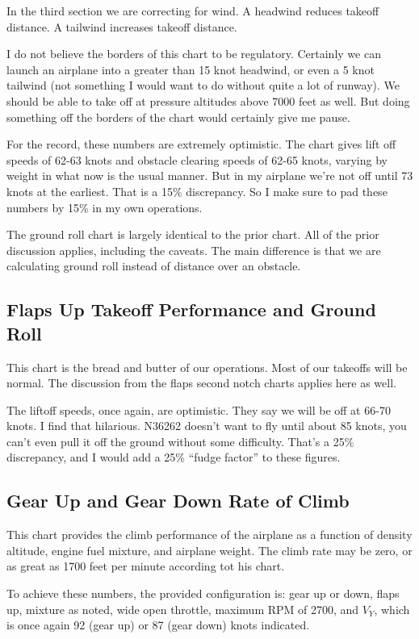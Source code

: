 In the third section we are correcting for wind. A headwind reduces takeoff distance. A tailwind increases takeoff distance.

I do not believe the borders of this chart to be regulatory. Certainly we can launch an airplane into a greater than 15 knot headwind, or even a 5 knot tailwind (not something I would want to do without quite a lot of runway). We should be able to take off at pressure altitudes above 7000 feet as well. But doing something off the borders of the chart would certainly give me pause.

For the record, these numbers are extremely optimistic. The chart gives lift off speeds of 62-63 knots and obstacle clearing speeds of 62-65 knots, varying by weight in what now is the usual manner. But in my airplane we're not off until 73 knots at the earliest. That is a 15\% discrepancy. So I make sure to pad these numbers by 15\% in my own operations.

The ground roll chart is largely identical to the prior chart. All of the prior discussion applies, including the caveats. The main difference is that we are calculating ground roll instead of distance over an obstacle.

\subsection{Flaps Up Takeoff Performance and Ground Roll}

This chart is the bread and butter of our operations. Most of our takeoffs will be normal. The discussion from the flaps second notch charts applies here as well.

The liftoff speeds, once again, are optimistic. They say we will be off at 66-70 knots. I find that hilarious. N36262 doesn't want to fly until about 85 knots, you can't even pull it off the ground without some difficulty. That's a 25\% discrepancy, and I would add a 25\% ``fudge factor'' to these figures.

\subsection{Gear Up and Gear Down Rate of Climb}

This chart provides the climb performance of the airplane as a function of density altitude, engine fuel mixture, and airplane weight. The climb rate may be zero, or as great as 1700 feet per minute according tot his chart.

To achieve these numbers, the provided configuration is: gear up or down, flaps up, mixture as noted, wide open throttle, maximum RPM of 2700, and $V_Y$, which is once again 92 (gear up) or 87 (gear down) knots indicated.

